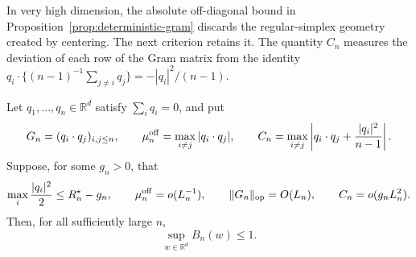 In very high dimension, the absolute off-diagonal bound in
Proposition~\ref{prop:deterministic-gram} discards the regular-simplex
geometry created by centering.  The next criterion retains it.  The
quantity \(C_n\) measures the deviation of
each row of the Gram matrix from the identity
\(q_i\cdot\{(n-1)^{-1}\sum_{j\ne i}q_j\}=-|q_i|^2/(n-1)\).

\begin{proposition}
\label{prop:local-simplex-criterion}
Let \(q_1,\ldots,q_n\in\mathbb R^d\) satisfy \(\sum_iq_i=0\), and put
\[
 G_n=(q_i\cdot q_j)_{i,j\le n},
 \qquad
 \mu_n^{\rm off}=\max_{i\ne j}|q_i\cdot q_j|,
 \qquad
 C_n=\max_{i\ne j}
 \left|q_i\cdot q_j+\frac{|q_i|^2}{n-1}\right|.
\]
Suppose, for some \(g_n>0\), that
\[
 \max_i\frac{|q_i|^2}{2}\le R_n^\star-g_n,
 \qquad
 \mu_n^{\rm off}=o(L_n^{-1}),
 \qquad
 \|G_n\|_{\rm op}=O(L_n),
 \qquad
 C_n=o(g_nL_n^2).
\]
Then, for all sufficiently large \(n\),
\[
 \sup_{w\in\mathbb R^d}B_n(w)\le1.
\]
\end{proposition}

